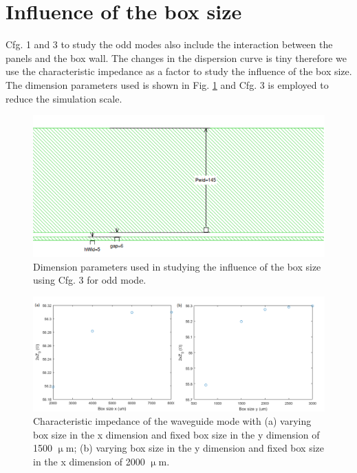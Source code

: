 \documentclass[noshowpacs,amsmath,
superscriptaddress,
10pt]{article}
\begin{document}
\section{Influence of the box size}
Cfg. 1 and 3 to study the odd modes also include the interaction between the panels and the box wall. The changes in the dispersion curve is tiny therefore we use the characteristic impedance as a factor to study the influence of the box size. The dimension parameters used is shown in Fig. \ref{pic:Dimension} and Cfg. 3 is employed to reduce the simulation scale. 

\begin{figure}[!ht]
\centering
\includegraphics[width=15cm] {Dimension}
\caption{Dimension parameters used in studying the influence of the box size using Cfg. 3 for odd mode.}
\label{pic:Dimension}
\end{figure}

\begin{figure}[!ht]
\centering
\includegraphics[width=15cm] {Z_bx}
\caption{Characteristic impedance of the waveguide mode with (a) varying box size in the x dimension and fixed box size in the y dimension of 1500 $\upmu$m; (b) varying box size in the y dimension and fixed box size in the x dimension of 2000 $\upmu$m.}
\label{pic:Z_bx}
\end{figure}
\end{document}
